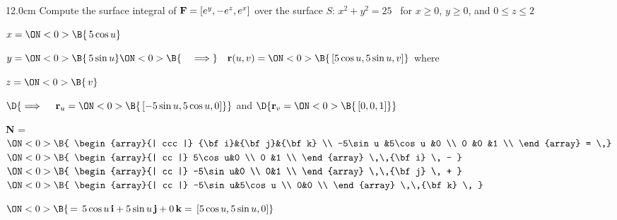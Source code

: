\begin{frame}
\begin{columns}\begin{column}{12.0cm}
\scriptsize
\EX Compute the surface integral of ${\bf F} = [e^y, -e^z, e^x]$ over the surface $S:\, x^2 + y^2 = 25$ \, for $x \ge 0$, $y \ge 0$, and $0 \le z \le 2$

\vspace{0.2cm}

\quad $
x =
\ON<0>{\B{\,5 \cos u}}$

\quad $
y =
\ON<0>{\B{\,5 \sin u}}
\ON<0>{\B{\quad \implies}} \quad {\bf r}(u,v) =
\ON<0>{\B{\, [5\cos u,5 \sin u,v]}}$ \qquad where \quad
{}

\quad $
z =
\ON<0>{\B{\,v}}$

\vspace{0.2cm}
\hspace{1.3cm} $\D{
\implies \quad {\bf r}_u =
\ON<0>{\B{\, [-5\sin u,5\cos u,0]}}}$ \qquad 
and
\qquad $\D{
{\bf r}_v = 
\ON<0>{\B{\,[0,0,1]}}}$

\vspace{0.3cm}

{\bf N} = \,
$\ON<0>{\B{
\begin{array}{| ccc |}
	{\bf i}&{\bf j}&{\bf k} \\
	-5\sin u      &5\cos u     &0 \\
 	0      &0      &1 \\
\end{array}
= \,}}$
$\ON<0>{\B{
\begin{array}{| cc |}
		  5\cos u&0 \\
 		  0 &1 \\
\end{array}
 \,\,{\bf i} \, - }}$\,\,
$\ON<0>{\B{
\begin{array}{| cc |}
		  -5\sin u&0 \\
 		  0&1 \\
\end{array}
 \,\,{\bf j} \, + }}$\,\,
$\ON<0>{\B{
\begin{array}{| cc |}
		  -5\sin u&5\cos u \\
 		  0&0 \\
\end{array}
\,\,{\bf k} \, }}$\\

\vspace{0.3cm}

\hspace{3.65cm} $\ON<0>{\B{\, = \, 5\cos u \,{\bf i} + 5\sin u\,{\bf j} + 0\,{\bf k} = \, [5\cos u,5\sin u,0]}}$


\end{column}
\end{columns}
\end{frame}
